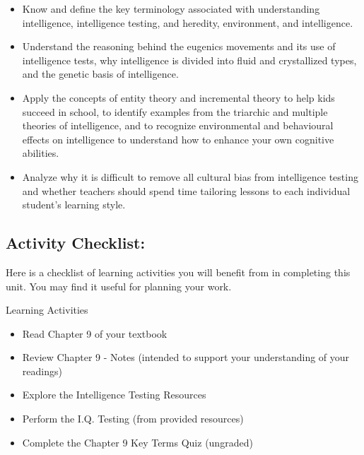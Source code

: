 \documentclass[
]{book}
\providecommand{\tightlist}{%
  \setlength{\itemsep}{0pt}\setlength{\parskip}{0pt}}
\begin{document}
\begin{itemize}
\tightlist
\item
  Know and define the key terminology associated with understanding intelligence, intelligence testing, and heredity, environment, and intelligence.\\
\item
  Understand the reasoning behind the eugenics movements and its use of intelligence tests, why intelligence is divided into fluid and crystallized types, and the genetic basis of intelligence.\\
\item
  Apply the concepts of entity theory and incremental theory to help kids succeed in school, to identify examples from the triarchic and multiple theories of intelligence, and to recognize environmental and behavioural effects on intelligence to understand how to enhance your own cognitive abilities.\\
\item
  Analyze why it is difficult to remove all cultural bias from intelligence testing and whether teachers should spend time tailoring lessons to each individual student's learning style.
\end{itemize}

\hypertarget{activity-checklist-1}{%
\subsection*{Activity Checklist:}\label{activity-checklist-1}}

Here is a checklist of learning activities you will benefit from in completing this unit. You may find it useful for planning your work.

\begin{reflect}
{Learning Activities}

\begin{itemize}
\tightlist
\item
  Read Chapter 9 of your textbook
\item
  Review Chapter 9 - Notes (intended to support your understanding of your readings)
\item
  Explore the Intelligence Testing Resources
\item
  Perform the I.Q. Testing (from provided resources)
\item
  Complete the Chapter 9 Key Terms Quiz (ungraded)
\end{itemize}
\end{reflect}
\end{document}

